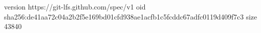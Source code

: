 version https://git-lfs.github.com/spec/v1
oid sha256:de41aa72c04a2b2f5e169bd01cfd938ae1acfb1c5fcddc67adfc0119d409f7c3
size 43840
